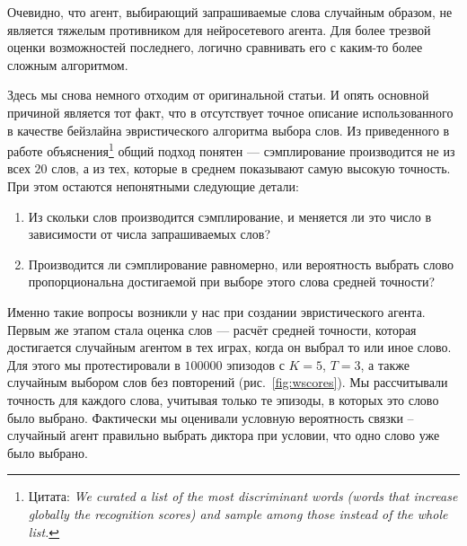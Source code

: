 Очевидно, что агент, выбирающий запрашиваемые слова случайным образом, не
является тяжелым противником для нейросетевого агента. Для более трезвой
оценки возможностей последнего, логично сравнивать его с каким-то более сложным
алгоритмом.

Здесь мы снова немного отходим от оригинальной статьи. И опять основной
причиной является тот факт, что в \citeisr{} отсутствует точное описание
использованного в качестве бейзлайна эвристического алгоритма выбора слов.
Из приведенного в работе объяснения\footnote{
    Цитата: \textit{We curated a list of the most discriminant
    words (words that increase globally the recognition scores)
    and sample among those instead of the whole list.}
}
общий подход понятен --- сэмплирование производится не из всех $20$ слов, а
из тех, которые в среднем показывают самую высокую точность. При этом остаются
непонятными следующие детали:
\begin{enumerate}
    \item Из скольки слов производится сэмплирование, и меняется ли это число
    в зависимости от числа запрашиваемых слов?
    \item Производится ли сэмплирование равномерно, или вероятность выбрать
    слово пропорциональна достигаемой при выборе этого слова средней точности?
\end{enumerate}

Именно такие вопросы возникли у нас при создании эвристического агента. Первым
же этапом стала оценка слов --- расчёт средней точности, которая достигается
случайным агентом в тех играх, когда он выбрал то или иное слово. Для этого мы
протестировали \guesser{} в $100000$ эпизодов с $K = 5$, $T = 3$, а также
случайным выбором слов без повторений (рис.~\ref{fig:wscores}). Мы рассчитывали точность для каждого слова,
учитывая только те эпизоды, в которых это слово было выбрано. Фактически мы оценивали
условную вероятность связки \guesser{}--случайный агент правильно выбрать диктора
при условии, что одно слово уже было выбрано.

